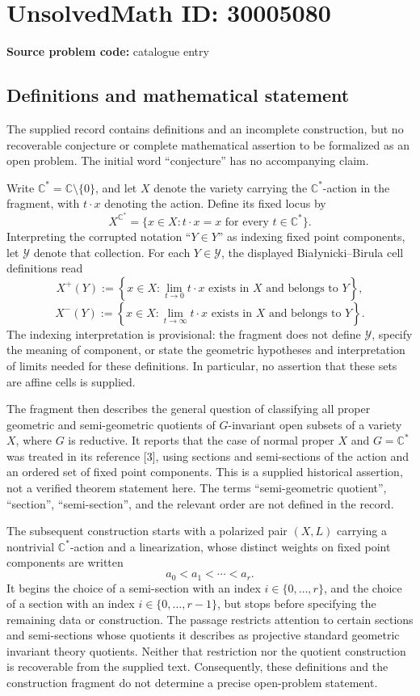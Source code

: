 \documentclass[11pt]{article}
\newcommand{\C}{\mathbb{C}}
\begin{document}
\section*{UnsolvedMath ID: 30005080}
\textbf{Source problem code:} catalogue entry
\subsection{Definitions and mathematical statement}
The supplied record contains definitions and an incomplete construction, but no recoverable conjecture or complete mathematical assertion to be formalized as an open problem. The initial word ``conjecture'' has no accompanying claim.

Write \(\C^*=\C\setminus\{0\}\), and let \(X\) denote the variety carrying the \(\C^*\)-action in the fragment, with \(t\cdot x\) denoting the action. Define its fixed locus by
\[
X^{\C^*}=\{x\in X: t\cdot x=x\text{ for every }t\in\C^*\}.
\]
Interpreting the corrupted notation ``\(Y\in Y\)'' as indexing fixed point components, let \(\mathcal Y\) denote that collection. For each \(Y\in\mathcal Y\), the displayed Bia\l{}ynicki--Birula cell definitions read
\[
X^+(Y):=\left\{x\in X:\lim_{t\to0}t\cdot x\text{ exists in }X\text{ and belongs to }Y\right\},
\]
\[
X^-(Y):=\left\{x\in X:\lim_{t\to\infty}t\cdot x\text{ exists in }X\text{ and belongs to }Y\right\}.
\]
The indexing interpretation is provisional: the fragment does not define \(\mathcal Y\), specify the meaning of component, or state the geometric hypotheses and interpretation of limits needed for these definitions. In particular, no assertion that these sets are affine cells is supplied.

The fragment then describes the general question of classifying all proper geometric and semi-geometric quotients of \(G\)-invariant open subsets of a variety \(X\), where \(G\) is reductive. It reports that the case of normal proper \(X\) and \(G=\C^*\) was treated in its reference [3], using sections and semi-sections of the action and an ordered set of fixed point components. This is a supplied historical assertion, not a verified theorem statement here. The terms ``semi-geometric quotient'', ``section'', ``semi-section'', and the relevant order are not defined in the record.

The subsequent construction starts with a polarized pair \((X,L)\) carrying a nontrivial \(\C^*\)-action and a linearization, whose distinct weights on fixed point components are written
\[
a_0<a_1<\cdots<a_r.
\]
It begins the choice of a semi-section with an index \(i\in\{0,\ldots,r\}\), and the choice of a section with an index \(i\in\{0,\ldots,r-1\}\), but stops before specifying the remaining data or construction. The passage restricts attention to certain sections and semi-sections whose quotients it describes as projective standard geometric invariant theory quotients. Neither that restriction nor the quotient construction is recoverable from the supplied text. Consequently, these definitions and the construction fragment do not determine a precise open-problem statement.
\end{document}
